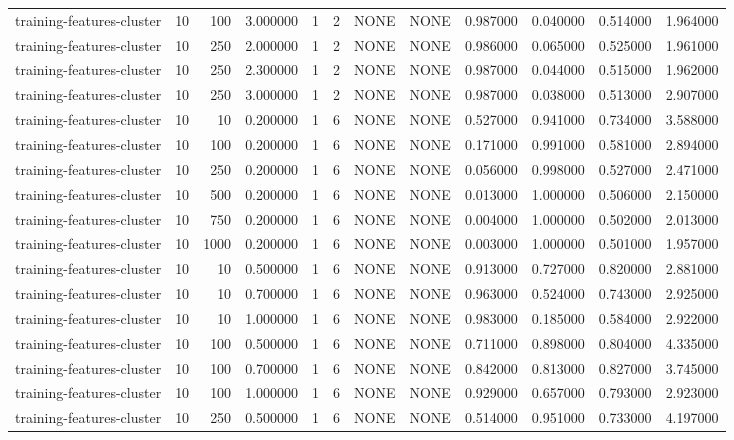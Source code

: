 \begin{tabular}{lrrrllllrrrr}
training-features-cluster & 10 & 100 & 3.000000 & 1 & 2 & NONE & NONE & 0.987000 & 0.040000 & 0.514000 & 1.964000 \\
training-features-cluster & 10 & 250 & 2.000000 & 1 & 2 & NONE & NONE & 0.986000 & 0.065000 & 0.525000 & 1.961000 \\
training-features-cluster & 10 & 250 & 2.300000 & 1 & 2 & NONE & NONE & 0.987000 & 0.044000 & 0.515000 & 1.962000 \\
training-features-cluster & 10 & 250 & 3.000000 & 1 & 2 & NONE & NONE & 0.987000 & 0.038000 & 0.513000 & 2.907000 \\
training-features-cluster & 10 & 10 & 0.200000 & 1 & 6 & NONE & NONE & 0.527000 & 0.941000 & 0.734000 & 3.588000 \\
training-features-cluster & 10 & 100 & 0.200000 & 1 & 6 & NONE & NONE & 0.171000 & 0.991000 & 0.581000 & 2.894000 \\
training-features-cluster & 10 & 250 & 0.200000 & 1 & 6 & NONE & NONE & 0.056000 & 0.998000 & 0.527000 & 2.471000 \\
training-features-cluster & 10 & 500 & 0.200000 & 1 & 6 & NONE & NONE & 0.013000 & 1.000000 & 0.506000 & 2.150000 \\
training-features-cluster & 10 & 750 & 0.200000 & 1 & 6 & NONE & NONE & 0.004000 & 1.000000 & 0.502000 & 2.013000 \\
training-features-cluster & 10 & 1000 & 0.200000 & 1 & 6 & NONE & NONE & 0.003000 & 1.000000 & 0.501000 & 1.957000 \\
training-features-cluster & 10 & 10 & 0.500000 & 1 & 6 & NONE & NONE & 0.913000 & 0.727000 & 0.820000 & 2.881000 \\
training-features-cluster & 10 & 10 & 0.700000 & 1 & 6 & NONE & NONE & 0.963000 & 0.524000 & 0.743000 & 2.925000 \\
training-features-cluster & 10 & 10 & 1.000000 & 1 & 6 & NONE & NONE & 0.983000 & 0.185000 & 0.584000 & 2.922000 \\
training-features-cluster & 10 & 100 & 0.500000 & 1 & 6 & NONE & NONE & 0.711000 & 0.898000 & 0.804000 & 4.335000 \\
training-features-cluster & 10 & 100 & 0.700000 & 1 & 6 & NONE & NONE & 0.842000 & 0.813000 & 0.827000 & 3.745000 \\
training-features-cluster & 10 & 100 & 1.000000 & 1 & 6 & NONE & NONE & 0.929000 & 0.657000 & 0.793000 & 2.923000 \\
training-features-cluster & 10 & 250 & 0.500000 & 1 & 6 & NONE & NONE & 0.514000 & 0.951000 & 0.733000 & 4.197000 \\

\end{tabular}
